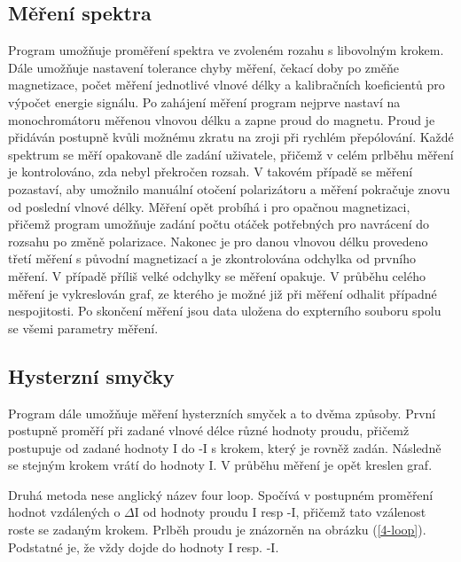\subsection{Měření spektra}
Program umožňuje proměření spektra ve zvoleném rozahu s libovolným krokem. Dále umožňuje nastavení tolerance chyby měření, čekací doby po změňe magnetizace, počet měření jednotlivé vlnové délky a kalibračních koeficientů pro výpočet energie signálu. Po zahájení měření program nejprve nastaví na monochromátoru měřenou vlnovou délku a zapne proud do magnetu. Proud je přidáván postupně kvůli možnému zkratu na zroji při rychlém přepólování. Každé spektrum se měří opakovaně dle zadání uživatele, přičemž v celém prlběhu měření je kontrolováno, zda nebyl překročen rozsah. V takovém případě se měření pozastaví, aby umožnilo manuální otočení polarizátoru a měření pokračuje znovu od poslední vlnové délky. Měření opět probíhá i pro opačnou magnetizaci, přičemž program umožňuje zadání počtu otáček potřebných pro navrácení do rozsahu po změně polarizace. Nakonec je pro danou vlnovou délku provedeno třetí měření s původní magnetizací a je zkontrolována odchylka od prvního měření. V případě příliš velké odchylky se měření opakuje. V průběhu celého měření je vykreslován graf, ze kterého je možné již při měření odhalit případné nespojitosti. Po skončení měření jsou data uložena do expterního souboru spolu se všemi parametry měření.

\subsection{Hysterzní smyčky}
Program dále umožňuje měření hysterzních smyček a to dvěma způsoby. První postupně proměří při zadané vlnové délce různé hodnoty proudu, přičemž postupuje od zadané hodnoty I do -I s krokem, který je rovněž zadán. Následně se stejným krokem vrátí do hodnoty I. V průběhu měření je opět kreslen graf.

Druhá metoda nese anglický název four loop. Spočívá v postupném proměření hodnot vzdálených o $\Delta$I od hodnoty proudu I resp -I, přičemž tato vzálenost roste se zadaným krokem. Prlběh proudu je znázorněn na obrázku (\ref{4-loop}). Podstatné je, že vždy dojde do hodnoty I resp. -I.
